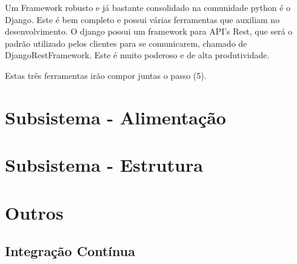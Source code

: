 Um Framework robusto e já bastante consolidado na comunidade python é o Django.
Este é bem completo e possui várias ferramentas que auxiliam no desenvolvimento.
O django possui um framework para API's Rest, que será o padrão utilizado pelos
clientes para se comunicarem, chamado de DjangoRestFramework. Este é muito poderoso
e de alta produtividade.

Estas três ferramentas irão compor juntas o passo (5).

\section{Subsistema - Alimentação}

\section{Subsistema - Estrutura}

\section{Outros}

\subsection{Integração Contínua}
